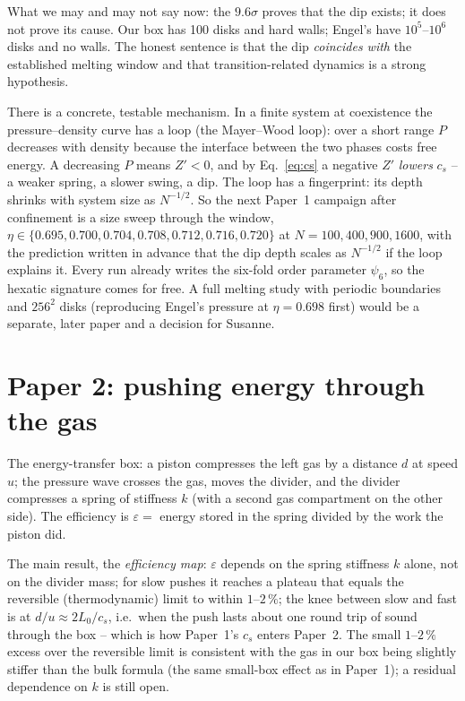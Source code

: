 \documentclass[11pt]{article}
\begin{document}
What we may and may not say now: the $9.6\sigma$ proves that the dip exists; it does not prove its cause. Our box has 100 disks and hard walls; Engel's have $10^5$--$10^6$ disks and no walls. The honest sentence is that the dip \emph{coincides with} the established melting window and that transition-related dynamics is a strong hypothesis.

There is a concrete, testable mechanism. In a finite system at coexistence the pressure--density curve has a loop (the Mayer--Wood loop): over a short range $P$ decreases with density because the interface between the two phases costs free energy. A decreasing $P$ means $Z' < 0$, and by Eq.~\eqref{eq:cs} a negative $Z'$ \emph{lowers} $c_s$ -- a weaker spring, a slower swing, a dip. The loop has a fingerprint: its depth shrinks with system size as $N^{-1/2}$. So the next Paper~1 campaign after confinement is a size sweep through the window, $\eta \in \{0.695, 0.700, 0.704, 0.708, 0.712, 0.716, 0.720\}$ at $N = 100, 400, 900, 1600$, with the prediction written in advance that the dip depth scales as $N^{-1/2}$ if the loop explains it. Every run already writes the six-fold order parameter $\psi_6$, so the hexatic signature comes for free. A full melting study with periodic boundaries and $256^2$ disks (reproducing Engel's pressure at $\eta = 0.698$ first) would be a separate, later paper and a decision for Susanne.

\section{Paper 2: pushing energy through the gas}
The energy-transfer box: a piston compresses the left gas by a distance $d$ at speed $u$; the pressure wave crosses the gas, moves the divider, and the divider compresses a spring of stiffness $k$ (with a second gas compartment on the other side). The efficiency is $\varepsilon = $ energy stored in the spring divided by the work the piston did.

The main result, the \emph{efficiency map}: $\varepsilon$ depends on the spring stiffness $k$ alone, not on the divider mass; for slow pushes it reaches a plateau that equals the reversible (thermodynamic) limit to within $1$--$2\,\%$; the knee between slow and fast is at $d/u \approx 2L_0/c_s$, i.e.\ when the push lasts about one round trip of sound through the box -- which is how Paper~1's $c_s$ enters Paper~2. The small $1$--$2\,\%$ excess over the reversible limit is consistent with the gas in our box being slightly stiffer than the bulk formula (the same small-box effect as in Paper~1); a residual dependence on $k$ is still open.
\end{document}
